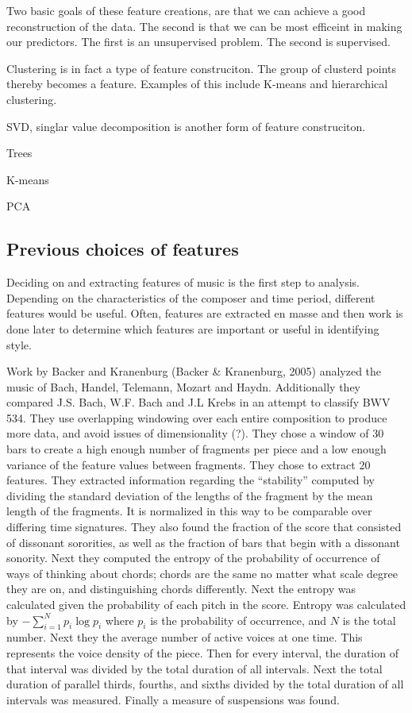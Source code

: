 \documentclass[12pt,twoside]{reedthesis}
\theoremstyle{definition}
\theoremstyle{definition}
\theoremstyle{definition}
\theoremstyle{remark}
\begin{document}
Two basic goals of these feature creations, are that we can achieve a
good reconstruction of the data. The second is that we can be most
efficeint in making our predictors. The first is an unsupervised
problem. The second is supervised.

Clustering is in fact a type of feature construciton. The group of
clusterd points thereby becomes a feature. Examples of this include
K-means and hierarchical clustering.

SVD, singlar value decomposition is another form of feature
construciton.

Trees

K-means

PCA

\subsection{Previous choices of
features}\label{previous-choices-of-features}

Deciding on and extracting features of music is the first step to
analysis. Depending on the characteristics of the composer and time
period, different features would be useful. Often, features are
extracted en masse and then work is done later to determine which
features are important or useful in identifying style.

Work by Backer and Kranenburg (Backer \& Kranenburg, 2005) analyzed the
music of Bach, Handel, Telemann, Mozart and Haydn. Additionally they
compared J.S. Bach, W.F. Bach and J.L Krebs in an attempt to classify
BWV 534. They use overlapping windowing over each entire composition to
produce more data, and avoid issues of dimensionality (?). They chose a
window of 30 bars to create a high enough number of fragments per piece
and a low enough variance of the feature values between fragments. They
chose to extract 20 features. They extracted information regarding the
``stability'' computed by dividing the standard deviation of the lengths
of the fragment by the mean length of the fragments. It is normalized in
this way to be comparable over differing time signatures. They also
found the fraction of the score that consisted of dissonant sororities,
as well as the fraction of bars that begin with a dissonant sonority.
Next they computed the entropy of the probability of occurrence of ways
of thinking about chords; chords are the same no matter what scale
degree they are on, and distinguishing chords differently. Next the
entropy was calculated given the probability of each pitch in the score.
Entropy was calculated by \(-\sum_{i = 1}^{N}p_i\log{p_i}\) where
\(p_i\) is the probability of occurrence, and \(N\) is the total number.
Next they the average number of active voices at one time. This
represents the voice density of the piece. Then for every interval, the
duration of that interval was divided by the total duration of all
intervals. Next the total duration of parallel thirds, fourths, and
sixths divided by the total duration of all intervals was measured.
Finally a measure of suspensions was found.
\end{document}
